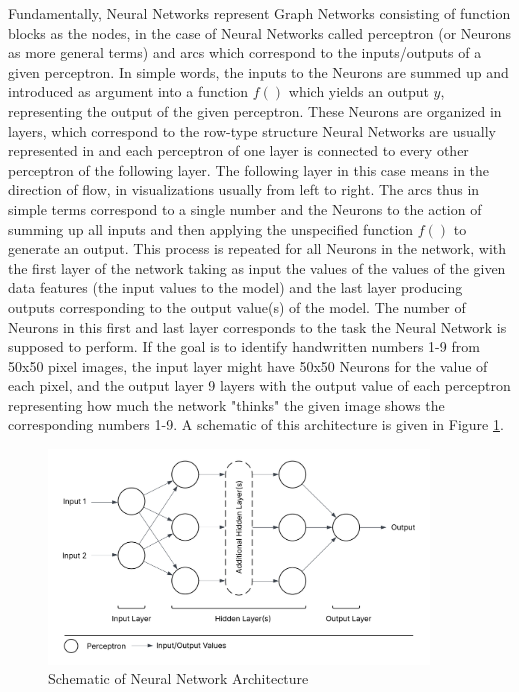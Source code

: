 Fundamentally, Neural Networks represent Graph Networks consisting of function blocks as the nodes, in the case of Neural Networks called perceptron (or Neurons as more general terms) and arcs which correspond to the inputs/outputs of a given perceptron. In simple words, the inputs to the Neurons are summed up and introduced as argument into a function $f()$ which yields an output $y$, representing the output of the given perceptron. These Neurons are organized in layers, which correspond to the row-type structure Neural Networks are usually represented in and each perceptron of one layer is connected to every other perceptron of the following layer. The following layer in this case means in the direction of flow, in visualizations usually from left to right. The arcs thus in simple terms correspond to a single number and the Neurons to the action of summing up all inputs and then applying the unspecified function $f()$ to generate an output. This process is repeated for all Neurons in the network, with the first layer of the network taking as input the values of the values of the given data features (the input values to the model) and the last layer producing outputs corresponding to the output value(s) of the model. The number of Neurons in this first and last layer corresponds to the task the Neural Network is supposed to perform. If the goal is to identify handwritten numbers 1-9 from 50x50 pixel images, the input layer might have 50x50 Neurons for the value of each pixel, and the output layer 9 layers with the output value of each perceptron representing how much the network "thinks" the given image shows the corresponding numbers 1-9. A schematic of this architecture is given in Figure \ref{fig:neural_network_architecture}.

\begin{figure}[h] 
\centering
\includegraphics[width=0.9\textwidth]{figures/modelling/neural_network_concept.png} %
\caption{Schematic of Neural Network Architecture}
\label{fig:neural_network_architecture}
\end{figure}

